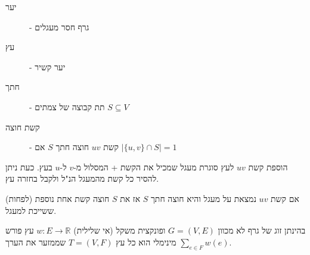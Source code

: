 \begin{description}
\item[יער] - 
גרף חסר מעגלים
\item[עץ] - 
יער קשיר
\item[חתך] - 
תת קבוצה של צמתים 
$S \subseteq V$
\item[קשת חוצה] - 
קשת $uv$ חוצה חתך $S$ אם 
$| \{u,v\} \cap S | = 1$
\end{description}

\begin{observation}
הוספת קשת $uv$ לעץ סוגרת מעגל שמכיל את הקשת + המסלול מ-$v$ ל-$u$ בעץ.
כעת ניתן להסיר כל קשת מהמעגל הנ"ל ולקבל בחזרה עץ.
\end{observation}

\begin{observation}
\label{observation:cycle}
אם קשת $uv$ נמצאת על מעגל והיא חוצה חתך $S$ אז את $S$ חוצה קשת אחת נוספת (לפחות)
ששייכת למעגל.
\end{observation}

\begin{definition}
בהינתן זוג של גרף לא מכוון 
$G = (V, E)$
ופונקצית משקל (אי שלילית)
$w:E \to \mathbb{R}$
עץ פורש מינימלי הוא כל עץ 
$T = (V, F)$
שממזער את הערך 
$\displaystyle\sum_{e \in F} w(e)$.
\end{definition}
